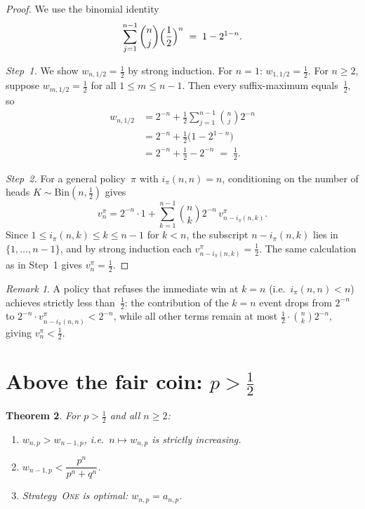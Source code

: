 \documentclass[reqno,final,11pt]{amsart}
\theoremstyle{plain}
\newtheorem{theorem}{Theorem}[section]
\theoremstyle{definition}
\theoremstyle{remark}
\newtheorem{remark}[theorem]{Remark}
\newcommand{\One}{\textsc{One}}
\begin{document}
\begin{proof}
  We use the binomial identity
  \begin{equation}\label{eq:bin-half}
    \sum_{j=1}^{n-1}\binom{n}{j}\Bigl(\frac{1}{2}\Bigr)^{n}
    \;=\; 1-2^{1-n}.
  \end{equation}

  \emph{Step~1.}  We show $w_{n,1/2}=\tfrac12$ by strong induction.
  For $n=1$: $w_{1,1/2}=\tfrac12$.  For $n\ge 2$, suppose
  $w_{m,1/2}=\tfrac12$ for all $1\le m\le n-1$.  Then every
  suffix-maximum equals~$\tfrac12$, so
  \begin{align*}
    w_{n,1/2}
    &= 2^{-n} + \frac{1}{2}\sum_{j=1}^{n-1}\binom{n}{j}2^{-n} \\
    &= 2^{-n} + \tfrac{1}{2}\bigl(1-2^{1-n}\bigr) \\
    &= 2^{-n} + \tfrac{1}{2} - 2^{-n}
    \;=\; \tfrac{1}{2}.
  \end{align*}

  \emph{Step~2.}  For a general policy~$\pi$ with
  $i_\pi(n,n)=n$, conditioning on the number of heads
  $K\sim\mathrm{Bin}(n,\tfrac12)$ gives
  \[
    v_n^\pi = 2^{-n}\cdot 1 + \sum_{k=1}^{n-1}\binom{n}{k}2^{-n}\,
    v_{n-i_\pi(n,k)}^\pi.
  \]
  Since $1\le i_\pi(n,k)\le k\le n-1$ for $k<n$, the subscript
  $n-i_\pi(n,k)$ lies in $\{1,\dots,n-1\}$, and by strong induction
  each $v_{n-i_\pi(n,k)}^\pi=\tfrac12$.  The same calculation as in
  Step~1 gives $v_n^\pi=\tfrac12$.
\end{proof}

\begin{remark}\label{rem:refuse}
  A policy that refuses the immediate win at $k=n$ (i.e.\
  $i_\pi(n,n)<n$) achieves strictly less than~$\tfrac12$: the
  contribution of the $k=n$ event drops from $2^{-n}$ to
  $2^{-n}\cdot v_{n-i_\pi(n,n)}^\pi < 2^{-n}$, while all other terms
  remain at most $\tfrac12\cdot\binom{n}{k}2^{-n}$, giving
  $v_n^\pi<\tfrac12$.
\end{remark}

\section{Above the fair coin: \texorpdfstring{$p>\tfrac12$}{p > 1/2}}
\label{sec:above}

\begin{theorem}\label{thm:above}
  For $p>\tfrac12$ and all $n\ge 2$:
  \begin{enumerate}[\rm(i)]
  \item $w_{n,p}>w_{n-1,p}$, i.e.\ $n\mapsto w_{n,p}$ is strictly
    increasing.
  \item $w_{n-1,p}<\dfrac{p^n}{p^n+q^n}$.
  \item Strategy~\One{} is optimal: $w_{n,p}=a_{n,p}$.
  \end{enumerate}
\end{theorem}
\end{document}
